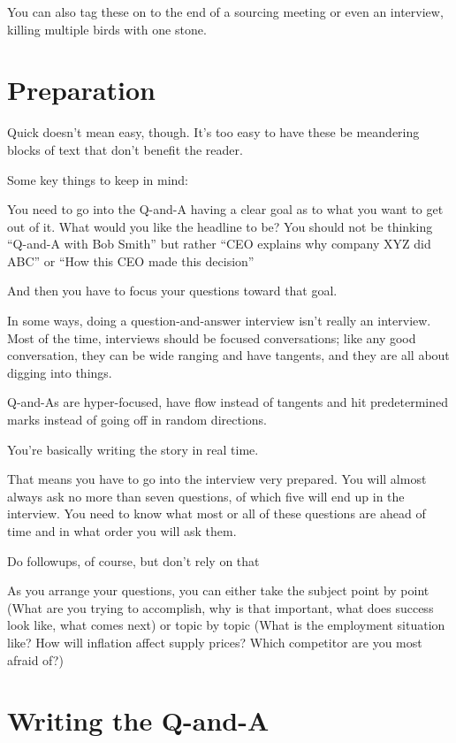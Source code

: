 \documentclass[
  12pt,
  american,
  letterpaperpaper,
  extrafontsizes,onecolumn,openright
  ]{memoir}
\begin{document}
You can also tag these on to the end of a sourcing meeting or even an interview, killing multiple birds with one stone.

\hypertarget{preparation}{%
\section*{Preparation}\label{preparation}}

Quick doesn't mean easy, though. It's too easy to have these be meandering blocks of text that don't benefit the reader.

Some key things to keep in mind:

You need to go into the Q-and-A having a clear goal as to what you want to get out of it. What would you like the headline to be? You should not be thinking \enquote{Q-and-A with Bob Smith} but rather \enquote{CEO explains why company XYZ did ABC} or \enquote{How this CEO made this decision}

And then you have to focus your questions toward that goal.

In some ways, doing a question-and-answer interview isn't really an interview. Most of the time, interviews should be focused conversations; like any good conversation, they can be wide ranging and have tangents, and they are all about digging into things.

Q-and-As are hyper-focused, have flow instead of tangents and hit predetermined marks instead of going off in random directions.

You're basically writing the story in real time.

That means you have to go into the interview very prepared. You will almost always ask no more than seven questions, of which five will end up in the interview. You need to know what most or all of these questions are ahead of time and in what order you will ask them.

Do followups, of course, but don't rely on that

As you arrange your questions, you can either take the subject point by point (What are you trying to accomplish, why is that important, what does success look like, what comes next) or topic by topic (What is the employment situation like? How will inflation affect supply prices? Which competitor are you most afraid of?)

\hypertarget{writing-the-q-and-a}{%
\section*{Writing the Q-and-A}\label{writing-the-q-and-a}}
\end{document}
